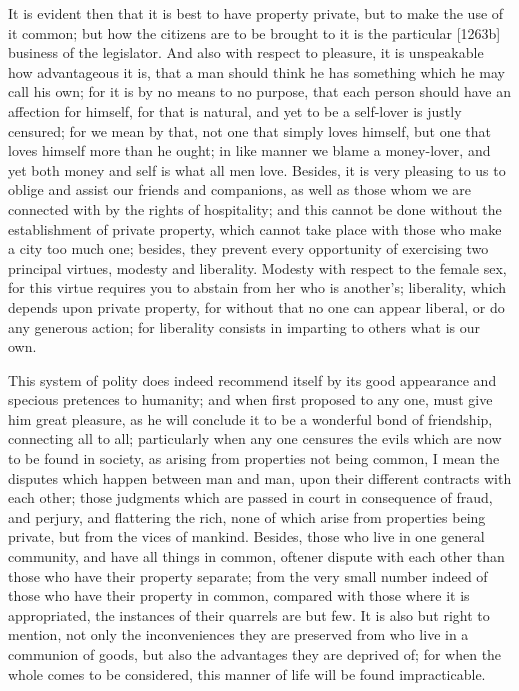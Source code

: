 It is evident then that it is best to have property private, but to make
the use of it common; but how the citizens are to be brought to it is the
particular [1263b] business of the legislator. And also with respect to
pleasure, it is unspeakable how advantageous it is, that a man should
think he has something which he may call his own; for it is by no means to
no purpose, that each person should have an affection for himself, for
that is natural, and yet to be a self-lover is justly censured; for we
mean by that, not one that simply loves himself, but one that loves
himself more than he ought; in like manner we blame a money-lover, and yet
both money and self is what all men love. Besides, it is very pleasing to
us to oblige and assist our friends and companions, as well as those whom
we are connected with by the rights of hospitality; and this cannot be
done without the establishment of private property, which cannot take
place with those who make a city too much one; besides, they prevent every
opportunity of exercising two principal virtues, modesty and liberality.
Modesty with respect to the female sex, for this virtue requires you to
abstain from her who is another's; liberality, which depends upon private
property, for without that no one can appear liberal, or do any generous
action; for liberality consists in imparting to others what is our own.

This system of polity does indeed recommend itself by its good appearance
and specious pretences to humanity; and when first proposed to any one,
must give him great pleasure, as he will conclude it to be a wonderful
bond of friendship, connecting all to all; particularly when any one
censures the evils which are now to be found in society, as arising from
properties not being common, I mean the disputes which happen between man
and man, upon their different contracts with each other; those judgments
which are passed in court in consequence of fraud, and perjury, and
flattering the rich, none of which arise from properties being private,
but from the vices of mankind. Besides, those who live in one general
community, and have all things in common, oftener dispute with each other
than those who have their property separate; from the very small number
indeed of those who have their property in common, compared with those
where it is appropriated, the instances of their quarrels are but few. It
is also but right to mention, not only the inconveniences they are
preserved from who live in a communion of goods, but also the advantages
they are deprived of; for when the whole comes to be considered, this
manner of life will be found impracticable.

